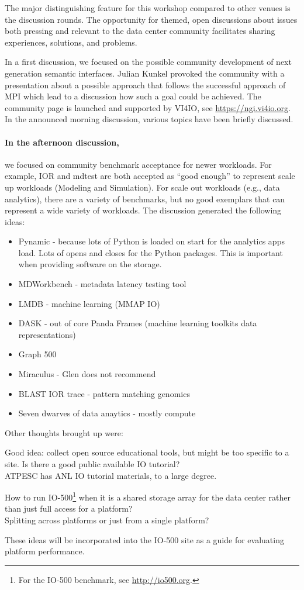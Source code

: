 \documentclass{llncs}
\begin{document}
The major distinguishing feature for this workshop compared to other venues is the discussion rounds.
The opportunity for themed, open discussions about issues both pressing and relevant to the data center
community facilitates sharing experiences, solutions, and problems.

In a first discussion, we focused on the possible community development of next generation semantic interfaces. Julian Kunkel provoked the community with a presentation about a possible approach that follows the successful approach of MPI which lead to a discussion how such a goal could be achieved.
The community page is launched and supported by VI4IO, see \url{https://ngi.vi4io.org}.
In the announced morning discussion, various topics have been briefly discussed.

\paragraph{In the afternoon discussion,} we focused on community benchmark acceptance for newer workloads. For example, IOR and mdtest are both accepted as ``good enough'' to represent scale up workloads (Modeling and Simulation). For scale out workloads (e.g., data analytics), there are a variety of benchmarks, but no good exemplars that can represent a wide variety of workloads. The discussion generated the following ideas:

\begin{itemize}
\item Pynamic - because lots of Python is loaded on start for the analytics apps load.
Lots of opens and closes for the Python packages. This is important when providing software on the storage.
\item MDWorkbench - metadata latency testing tool
\item LMDB - machine learning (MMAP IO)
\item DASK - out of core Panda Frames (machine learning toolkits data representations)
\item  Graph 500
\item  Miraculus - Glen does not recommend
\item BLAST IOR trace - pattern matching genomics
\item Seven dwarves of data anaytics - mostly compute
\end{itemize}
Other thoughts brought up were:

Good idea: collect open source educational tools, but might be too specific to a site.
Is there a good public available IO tutorial?\\
ATPESC has ANL IO tutorial materials, to a large degree.

How to run IO-500\footnote{For the IO-500 benchmark, see \url{http://io500.org}.} when it is a shared storage array for the data center rather than just full access for a platform?\\
Splitting across platforms or just from a single platform?

These ideas will be incorporated into the IO-500 site as a guide for evaluating platform performance.


{}
\end{document}
